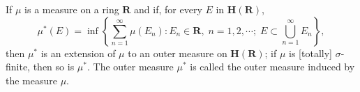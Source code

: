 If $\mu$ is a measure on a ring $\mathbf{R}$ and if, for every $E$ in $\mathbf{H}(\mathbf{R})$,
$$\mu^*(E) = \inf \left\{ \sum_{n=1}^{\infty} \mu(E_n): E_n \in \mathbf{R}, \; n = 1, 2, \cdots; \; E \subset \bigcup_{n=1}^{\infty} E_n \right\},$$
then $\mu^*$ is an extension of $\mu$ to an outer measure on $\mathbf{H}(\mathbf{R})$; if $\mu$ is [totally] $\sigma$-finite, then so is $\mu^*$. The outer measure $\mu^*$ is called the outer measure induced by the measure $\mu$.
